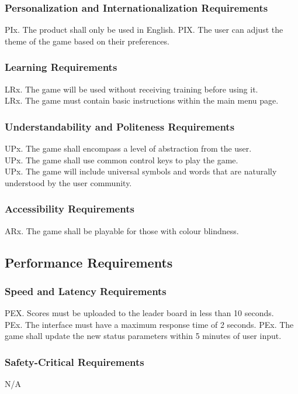 \documentclass[12pt]{article}
\begin{document}
    \subsubsection{Personalization and Internationalization Requirements}
    PIx. The product shall only be used in English.
    PIX. The user can adjust the theme of the game based on their preferences.
    
    \subsubsection{Learning Requirements}
    LRx. The game will be used without receiving training before using it.\\
    LRx. The game must contain basic instructions within the main menu page.

    \subsubsection{Understandability and Politeness Requirements}
    UPx. The game shall encompass a level of abstraction from the user.\\
    UPx. The game shall use common control keys to play the game.\\
    UPx. The game will include universal symbols and words that are naturally understood by the user community.
    
    \subsubsection{Accessibility Requirements}
    ARx. The game shall be playable for those with colour blindness.
    
\subsection{Performance Requirements}
    \subsubsection{Speed and Latency Requirements}
    PEX. Scores must be uploaded to the leader board in less than 10 seconds.\\
    PEx. The interface must have a maximum response time of 2 seconds.
    PEx. The game shall update the new status parameters within 5 minutes of user input.

    \subsubsection{Safety-Critical Requirements}
    N/A
    
\end{document}
